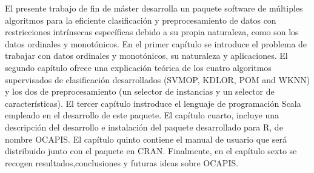 
El presente trabajo de fin de máster desarrolla un paquete software de múltiples algoritmos para la eficiente clasificación y preprocesamiento de datos con restricciones intrínsecas específicas debido a su propia naturaleza, como son los datos ordinales y monotónicos. \newline
En el primer capítulo se introduce el problema de trabajar con datos ordinales y monotónicos, su naturaleza y aplicaciones. El segundo capítulo ofrece una explicación teórica de  los cuatro algoritmos supervisados de clasificación desarrollados (SVMOP, KDLOR, POM and WKNN) y los dos de preprocesamiento (un  selector de instancias y un selector de características). El tercer capítulo instroduce el lenguaje de programación Scala empleado en el desarrollo de este paquete. El capítulo cuarto, incluye una descripción del desarrollo e instalación del paquete desarrollado para R, de nombre OCAPIS. El capítulo quinto contiene el manual de usuario que será distribuido junto con el paquete en CRAN. Finalmente, en el capítulo sexto se recogen resultados,conclusiones y futuras ideas sobre OCAPIS.
\newline \newline
{}
\newline {}